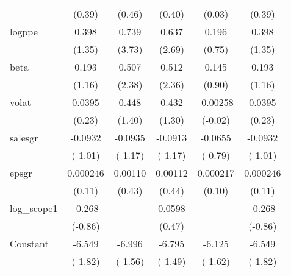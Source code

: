 \begin{table}[htbp]
\begin{tabular}{l*{5}{c}}
                    &      (0.39)         &      (0.46)         &      (0.40)         &      (0.03)         &      (0.39)         \\
[1em]
logppe              &       0.398         &       0.739\sym{***}&       0.637\sym{**} &       0.196         &       0.398         \\
                    &      (1.35)         &      (3.73)         &      (2.69)         &      (0.75)         &      (1.35)         \\
[1em]
beta                &       0.193         &       0.507\sym{*}  &       0.512\sym{*}  &       0.145         &       0.193         \\
                    &      (1.16)         &      (2.38)         &      (2.36)         &      (0.90)         &      (1.16)         \\
[1em]
volat               &      0.0395         &       0.448         &       0.432         &    -0.00258         &      0.0395         \\
                    &      (0.23)         &      (1.40)         &      (1.30)         &     (-0.02)         &      (0.23)         \\
[1em]
salesgr             &     -0.0932         &     -0.0935         &     -0.0913         &     -0.0655         &     -0.0932         \\
                    &     (-1.01)         &     (-1.17)         &     (-1.17)         &     (-0.79)         &     (-1.01)         \\
[1em]
epsgr               &    0.000246         &     0.00110         &     0.00112         &    0.000217         &    0.000246         \\
                    &      (0.11)         &      (0.43)         &      (0.44)         &      (0.10)         &      (0.11)         \\
[1em]
log\_scope1          &      -0.268         &                     &      0.0598         &                     &      -0.268         \\
                    &     (-0.86)         &                     &      (0.47)         &                     &     (-0.86)         \\
[1em]
Constant            &      -6.549         &      -6.996         &      -6.795         &      -6.125         &      -6.549         \\
                    &     (-1.82)         &     (-1.56)         &     (-1.49)         &     (-1.62)         &     (-1.82)         \\

\end{tabular}
\end{table}
